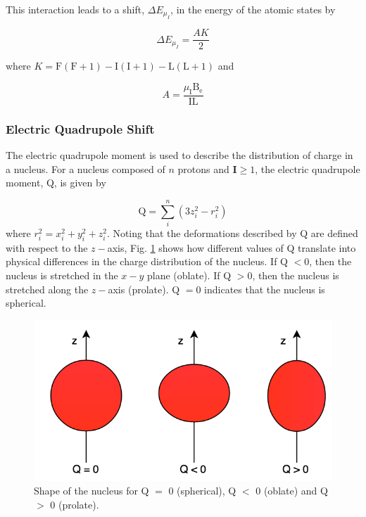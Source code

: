This interaction leads to a shift, $\Delta E_{\mu_I}$, in the energy of the atomic states by

\begin{equation}
\Delta E_{\mu_I} = \frac{AK}{2}
\end{equation}

where $K = \mathrm{F(F+1) - I(I+1) - L(L+1)}$ and 

\begin{equation}
A = \frac{\mu_{\mathrm{I}}\mathrm{B_e}}{\mathrm{IL}}
\end{equation}

\subsubsection{Electric Quadrupole Shift}
The electric quadrupole moment is used to describe the distribution of charge in a nucleus. For a nucleus composed of $n$ protons and $\mathbf{I}\geq1$, the electric quadrupole moment, Q, is given by

\begin{equation}
\mathrm{Q} = \sum_i^n (3z_i^2-r_i^2)
\end{equation}
where $r_i^2 = x_i^2+y_i^2+z_i^2$. Noting that the deformations described by Q are defined with respect to the $z-$axis, Fig. \ref{Q} shows how different values of Q translate into physical differences in the charge distribution of the nucleus. If Q $ < 0$, then the nucleus is stretched in the $x-y$ plane (oblate). If Q $ > 0$, then the nucleus is stretched along the $z-$axis (prolate). Q $=0$ indicates that the nucleus is spherical. 

\begin{figure}[h]
\begin{center}
\includegraphics[width=\textwidth]{Graphics/Q_pic.png}
\small
\caption{Shape of the nucleus for Q $=$ 0 (spherical), Q $<$ 0 (oblate) and Q $>$ 0 (prolate).}
\end{center}
\label{Q}
\end{figure}

